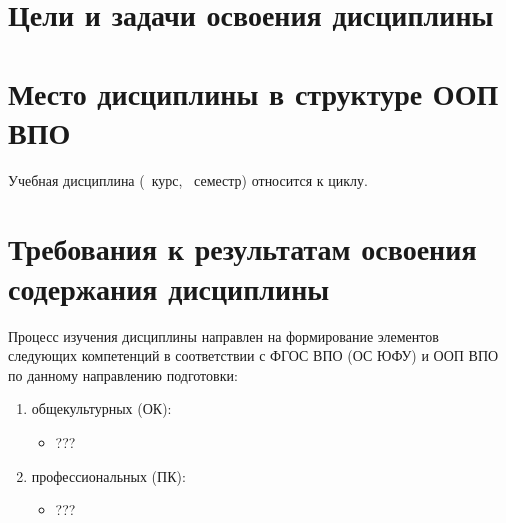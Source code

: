 






\section{Цели и задачи освоения дисциплины}

\section{Место дисциплины в структуре ООП ВПО}


	\ssect Учебная дисциплина \thecourse{}
(\theyearofstudy~курс, \theterm~семестр) относится к 
циклу.

	\ssect %

	\ssect %

\section{Требования к результатам освоения содержания дисциплины}

	\ssect
Процесс изучения дисциплины направлен на формирование элементов следующих компетенций в соответствии с ФГОС ВПО (ОС ЮФУ) и ООП ВПО по данному направлению подготовки:
\begin{enumerate}
\rusitems %
	\item общекультурных (ОК):
	\begin{itemize}
		\item ???
	\end{itemize}

	\item профессиональных (ПК):
	\begin{itemize}
		\item ???
	\end{itemize}
\end{enumerate}

